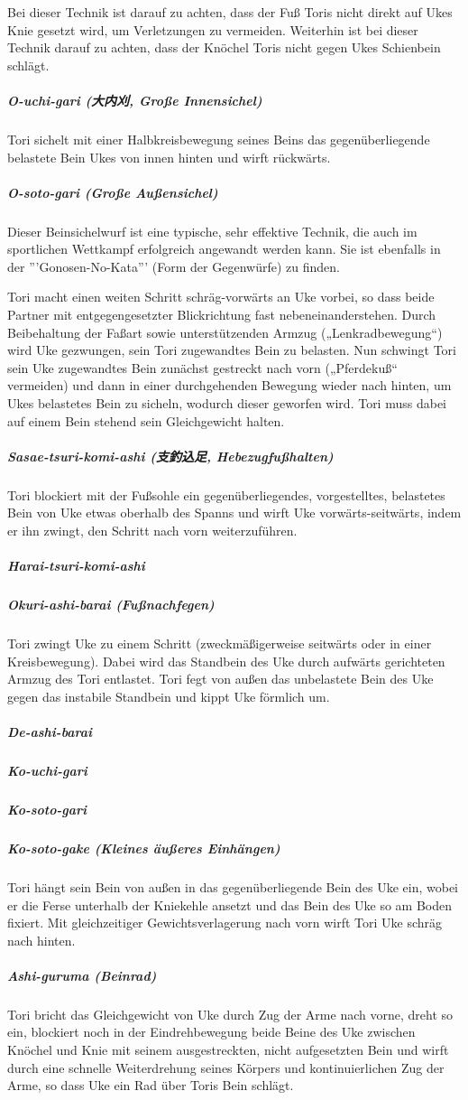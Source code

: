 \documentclass[justified, a4paper, notitlepage, captions=tableheading, nobib]{tufte-handout}
\begin{document}
Bei dieser Technik ist darauf zu achten, dass der Fuß Toris nicht direkt auf Ukes Knie gesetzt wird, um Verletzungen zu vermeiden. Weiterhin ist bei dieser Technik darauf zu achten, dass der Knöchel Toris nicht gegen Ukes Schienbein schlägt.

\subparagraph{O-uchi-gari (大内刈, Große Innensichel)}
\label{sec:org0d44f8c}

Tori sichelt mit einer Halbkreisbewegung seines Beins das gegenüberliegende belastete Bein Ukes von innen hinten und wirft rückwärts.

\subparagraph{O-soto-gari (Große Außensichel)}
\label{sec:org0274ed1}
Dieser Beinsichelwurf ist eine typische, sehr effektive Technik, die auch im sportlichen Wettkampf erfolgreich angewandt werden kann. Sie ist ebenfalls in der '''Gonosen-No-Kata''' (Form der Gegenwürfe) zu finden.

Tori macht einen weiten Schritt schräg-vorwärts an Uke vorbei, so dass beide Partner mit entgegengesetzter Blickrichtung fast nebeneinanderstehen. Durch Beibehaltung der Faßart sowie unterstützenden Armzug („Lenkradbewegung“) wird Uke gezwungen, sein Tori zugewandtes Bein zu belasten. Nun schwingt Tori sein Uke zugewandtes Bein zunächst gestreckt nach vorn („Pferdekuß“ vermeiden) und dann in einer durchgehenden Bewegung wieder nach hinten, um Ukes belastetes Bein zu sicheln, wodurch dieser geworfen wird. Tori muss dabei auf einem Bein stehend sein Gleichgewicht halten.

\subparagraph{Sasae-tsuri-komi-ashi (支釣込足, Hebezugfußhalten)}
\label{sec:org9692bb7}
Tori blockiert mit der Fußsohle ein gegenüberliegendes, vorgestelltes, belastetes Bein von Uke etwas oberhalb des Spanns und wirft Uke vorwärts-seitwärts, indem er ihn zwingt, den Schritt nach vorn weiterzuführen.

\subparagraph{Harai-tsuri-komi-ashi}
\label{sec:org825cd78}
\subparagraph{Okuri-ashi-barai (Fußnachfegen)}
\label{sec:org538f3f9}
Tori zwingt Uke zu einem Schritt (zweckmäßigerweise seitwärts oder in einer Kreisbewegung). Dabei wird das Standbein des Uke durch aufwärts gerichteten Armzug des Tori entlastet. Tori fegt von außen das unbelastete Bein des Uke gegen das instabile Standbein und kippt Uke förmlich um.

\subparagraph{De-ashi-barai}
\label{sec:org5a6364a}
\subparagraph{Ko-uchi-gari}
\label{sec:org92b9de5}
\subparagraph{Ko-soto-gari}
\label{sec:orge9c1782}
\subparagraph{Ko-soto-gake (Kleines äußeres Einhängen)}
\label{sec:org60cef4a}
Tori hängt sein Bein von außen in das gegenüberliegende Bein des Uke ein, wobei er die Ferse unterhalb der Kniekehle ansetzt und das Bein des Uke so am Boden fixiert. Mit gleichzeitiger Gewichtsverlagerung nach vorn wirft Tori Uke schräg nach hinten.
\subparagraph{Ashi-guruma (Beinrad)}
\label{sec:org364693d}
Tori bricht das Gleichgewicht von Uke durch Zug der Arme nach vorne, dreht so ein, blockiert noch in der Eindrehbewegung beide Beine des Uke zwischen Knöchel und Knie mit seinem ausgestreckten, nicht aufgesetzten Bein und wirft durch eine schnelle Weiterdrehung seines Körpers und kontinuierlichen Zug der Arme, so dass Uke ein Rad über Toris Bein schlägt.
\end{document}
